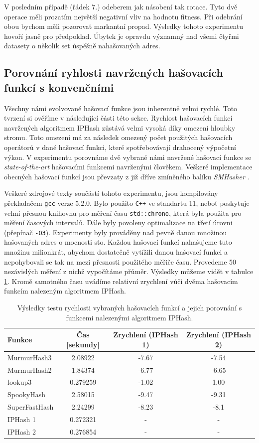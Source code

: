 V posledním případě (řádek 7.) odeberem jak násobení tak rotace. Tyto dvě operace měli prozatím největší negativní
vliv na hodnotu fitness. Při odebrání obou bychom měli pozorovat markantní propad. Výsledky tohoto experimentu 
hovoří jasně pro předpoklad. Úbytek je opravdu významný nad všemi čtyřmi datasety o několik set úspěšně nahašovaných adres.


\subsection{Porovnání ryhlosti navržených hašovacích funkcí s konvenčními}
Všechny námi evolvované hašovací funkce jsou inherentně velmi rychlé. Toto
tvrzení si ověříme v následující části této sekce. Rychlost hašovacích funkcí navržených algoritmem IPHash zůstává
velmi vysoká díky omezení hloubky stromu. Toto omezení má za následek omezený počet použitých hašovacích operátorů v
dané hašovací funkci, které spotřebovávají drahocený výpočetní výkon. V experimentu porovnáme dvě vybrané námi navržené
hašovací funkce se \textit{state-of-the-art} hašovacími funkcemi navrženými člověkem. Veškeré implementace obecných hašovací funkcí
jsou převzaty z již dříve zmíněného balíku \textit{SMHasher} \cite{appleby2016}. 

Veškeré zdrojové texty součástí tohoto experimentu,
jsou kompilovány překladačem \texttt{gcc} verze 5.2.0. Bylo použito \texttt{C++} ve standartu 11, neboť poskytuje velmi
přesnou knihovnu pro měření času \texttt{std::chrono}, která byla použita pro měření časových intervalů. Dále byly
povoleny optimalizace na třetí úrovni (přepínač \texttt{-O3}). Experimenty byly prováděny nad pevně danou množinou
hašovaných adres o mocnosti sto. Každou hašovací funkcí nahašujeme tuto množinu milionkrát, abychom dostatečně 
vytížili danou hašovací funkci a nepohybovali se tak na mezi přesnosti použitého měřiče času. Provedeme 50 nezávislých
měření z nichž vypočítáme přůměr. Výsledky můžeme vidět v tabulce \ref{tab:speedcomparison}. Kromě samotného času
uvádíme relativní zrychlení vůči dvěma hašovacím funkcím nalezeným algoritmem IPHash.

\begin{table}[!ht]
	\centering
	\caption{Výsledky testu rychlosti vybraných hašovacích funkcí a jejich porovnání s funkcemi nalezenými algoritmem IPHash.}
	\begin{tabular}{lccc}
		\hline
		Funkce & Čas [sekundy]  & Zrychlení (IPHash 1) & Zrychlení (IPHash 2) \\ 
		\hline
		MurmurHash3   & 2.08922  & -7.67 & -7.54 \\
		MurmurHash2   & 1.84374  & -6.77 & -6.65 \\
		lookup3       & 0.279259 & -1.02 &  1.00 \\
		SpookyHash    & 2.58015  & -9.47 & -9.31 \\
		SuperFastHash & 2.24299  & -8.23 & -8.1  \\ 
		\hline
		IPHash 1      & 0.272321 & - & - \\
		IPHash 2      & 0.276854 & - & - \\
		\hline
	\end{tabular}	
	\label{tab:speedcomparison}
\end{table}

